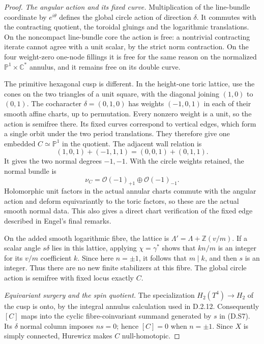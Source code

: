 \begin{proof}
\emph{The angular action and its fixed curve.}
Multiplication of the line-bundle coordinate by
$e^{i\theta}$ defines the global circle action of direction
$\delta$. It commutes with the contracting quotient,
the toroidal gluings and the logarithmic translations.
On the noncompact line-bundle core the action is free:
a nontrivial contracting iterate cannot agree with a unit
scalar, by the strict norm contraction. On the four
weight-zero one-node fillings it is free for the same
reason on the normalized $\mathbb P^1\times\mathbb C^*$
annulus, and it remains free on its double curve.

The primitive hexagonal cusp is different. In the height-one
toric lattice, use the cones on the two triangles of a unit
square, with the diagonal joining $(1,0)$ to $(0,1)$.
The cocharacter $\delta=(0,1,0)$ has weights $(-1,0,1)$
in each of their smooth affine charts, up to permutation.
Every nonzero weight is a unit, so the action is semifree
there. Its fixed curves correspond to vertical edges, which
form a single orbit under the two period translations.
They therefore give one embedded $C\simeq\mathbb P^1$
in the quotient. The adjacent wall relation is
\[
 (1,0,1)+(-1,1,1)=(0,0,1)+(0,1,1).
\]
It gives the two normal degrees $-1,-1$. With the circle
weights retained, the normal bundle is
\[
 \nu_C=\mathcal O(-1)_{+1}\oplus\mathcal O(-1)_{-1}.
 \tag{D.S11}
\]
Holomorphic unit factors in the actual annular charts
commute with the angular action and deform equivariantly
to the toric factors, so these are the actual smooth
normal data. This also gives a direct chart verification
of the fixed edge described in Engel's final remarks.

On the added smooth logarithmic fibre, the lattice is
$\Lambda'=\Lambda+\mathbb Z(v/m)$. If a scalar angle
$s\delta$ lies in this lattice, applying $\chi=\gamma^*$
shows that $kn/m$ is an integer for its $v/m$ coefficient
$k$. Since here $n=\pm1$, it follows that $m\mid k$,
and then $s$ is an integer. Thus there are no new finite
stabilizers at this fibre. The global circle action is
semifree with fixed locus exactly $C$.

\emph{Equivariant surgery and the spin quotient.}
The specialization $H_2(T^4)\to H_2$ of the cusp is onto,
by the integral annulus calculation used in D.2.12.
Consequently $[C]$ maps into the cyclic fibre-coinvariant
summand generated by $s$ in (D.S7). Its $\delta$ normal
column imposes $ns=0$; hence $[C]=0$ when $n=\pm1$.
Since $X$ is simply connected, Hurewicz makes $C$
null-homotopic.


\end{proof}
